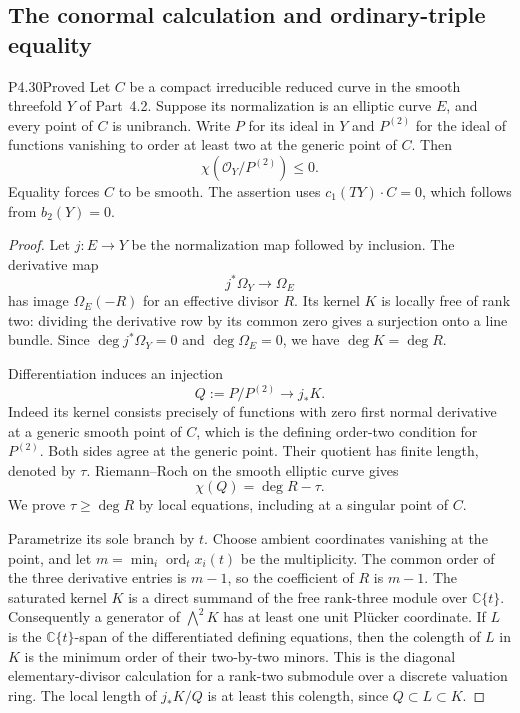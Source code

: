 \subsection{The conormal calculation and ordinary-triple equality}

\begin{statement}{P4.30}{Proved}
Let $C$ be a compact irreducible reduced curve in the smooth
threefold $Y$ of Part~4.2. Suppose its normalization is an elliptic
curve $E$, and every point of $C$ is unibranch. Write $P$ for its
ideal in $Y$ and $P^{(2)}$ for the ideal of functions vanishing to
order at least two at the generic point of $C$. Then
\[
 \chi(\mathcal O_Y/P^{(2)})\le0.
\]
Equality forces $C$ to be smooth. The assertion uses
$c_1(TY)\cdot C=0$, which follows from $b_2(Y)=0$.
\end{statement}
\begin{proof}
Let $j:E\to Y$ be the normalization map followed by inclusion.
The derivative map
\[
 j^*\Omega_Y\longrightarrow\Omega_E
\]
has image $\Omega_E(-R)$ for an effective divisor $R$.
Its kernel $K$ is locally free of rank two: dividing the derivative
row by its common zero gives a surjection onto a line bundle.
Since $\deg j^*\Omega_Y=0$ and $\deg\Omega_E=0$, we have
$\deg K=\deg R$.

Differentiation induces an injection
\[
 Q:=P/P^{(2)}\longrightarrow j_*K.
\]
Indeed its kernel consists precisely of functions with zero first
normal derivative at a generic smooth point of $C$, which is the
defining order-two condition for $P^{(2)}$. Both sides agree at the
generic point. Their quotient has finite length, denoted by $\tau$.
Riemann--Roch on the smooth elliptic curve gives
\[
 \chi(Q)=\deg R-\tau.
\]
We prove $\tau\ge\deg R$ by local equations, including at a
singular point of $C$.

Parametrize its sole branch by $t$. Choose ambient coordinates
vanishing at the point, and let
$m=\min_i\operatorname{ord}_t x_i(t)$ be the multiplicity.
The common order of the three derivative entries is $m-1$,
so the coefficient of $R$ is $m-1$. The saturated kernel $K$
is a direct summand of the free rank-three module over
$\mathbb C\{t\}$. Consequently a generator of $\bigwedge^2K$
has at least one unit Pl\"ucker coordinate. If $L$ is the
$\mathbb C\{t\}$-span of the differentiated defining equations,
then the colength of $L$ in $K$ is the minimum order of their
two-by-two minors. This is the diagonal elementary-divisor
calculation for a rank-two submodule over a discrete valuation
ring. The local length of $j_*K/Q$ is at least this colength,
since $Q\subset L\subset K$.


\end{proof}

